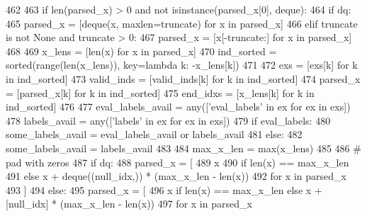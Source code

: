 \begin{DoxyCode}
462 
463         \textcolor{keywordflow}{if} len(parsed\_x) > 0 \textcolor{keywordflow}{and} \textcolor{keywordflow}{not} isinstance(parsed\_x[0], deque):
464             \textcolor{keywordflow}{if} dq:
465                 parsed\_x = [deque(x, maxlen=truncate) \textcolor{keywordflow}{for} x \textcolor{keywordflow}{in} parsed\_x]
466             \textcolor{keywordflow}{elif} truncate \textcolor{keywordflow}{is} \textcolor{keywordflow}{not} \textcolor{keywordtype}{None} \textcolor{keywordflow}{and} truncate > 0:
467                 parsed\_x = [x[-truncate:] \textcolor{keywordflow}{for} x \textcolor{keywordflow}{in} parsed\_x]
468 
469         x\_lens = [len(x) \textcolor{keywordflow}{for} x \textcolor{keywordflow}{in} parsed\_x]
470         ind\_sorted = sorted(range(len(x\_lens)), key=\textcolor{keyword}{lambda} k: -x\_lens[k])
471 
472         exs = [exs[k] \textcolor{keywordflow}{for} k \textcolor{keywordflow}{in} ind\_sorted]
473         valid\_inds = [valid\_inds[k] \textcolor{keywordflow}{for} k \textcolor{keywordflow}{in} ind\_sorted]
474         parsed\_x = [parsed\_x[k] \textcolor{keywordflow}{for} k \textcolor{keywordflow}{in} ind\_sorted]
475         end\_idxs = [x\_lens[k] \textcolor{keywordflow}{for} k \textcolor{keywordflow}{in} ind\_sorted]
476 
477         eval\_labels\_avail = any([\textcolor{stringliteral}{'eval\_labels'} \textcolor{keywordflow}{in} ex \textcolor{keywordflow}{for} ex \textcolor{keywordflow}{in} exs])
478         labels\_avail = any([\textcolor{stringliteral}{'labels'} \textcolor{keywordflow}{in} ex \textcolor{keywordflow}{for} ex \textcolor{keywordflow}{in} exs])
479         \textcolor{keywordflow}{if} eval\_labels:
480             some\_labels\_avail = eval\_labels\_avail \textcolor{keywordflow}{or} labels\_avail
481         \textcolor{keywordflow}{else}:
482             some\_labels\_avail = labels\_avail
483 
484         max\_x\_len = max(x\_lens)
485 
486         \textcolor{comment}{# pad with zeros}
487         \textcolor{keywordflow}{if} dq:
488             parsed\_x = [
489                 x
490                 \textcolor{keywordflow}{if} len(x) == max\_x\_len
491                 \textcolor{keywordflow}{else} x + deque((null\_idx,)) * (max\_x\_len - len(x))
492                 \textcolor{keywordflow}{for} x \textcolor{keywordflow}{in} parsed\_x
493             ]
494         \textcolor{keywordflow}{else}:
495             parsed\_x = [
496                 x \textcolor{keywordflow}{if} len(x) == max\_x\_len \textcolor{keywordflow}{else} x + [null\_idx] * (max\_x\_len - len(x))
497                 \textcolor{keywordflow}{for} x \textcolor{keywordflow}{in} parsed\_x

\end{DoxyCode}
